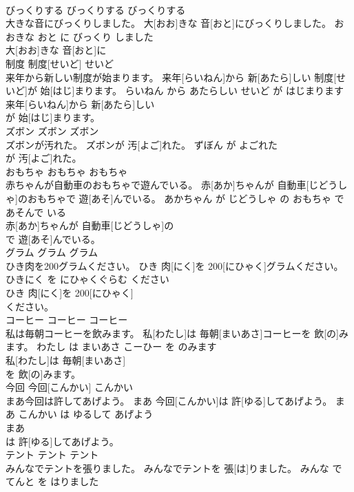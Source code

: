 \documentclass[8pt]{extreport}
\begin{document}
\begin{CJK}{UTF8}{min}
\\	びっくりする	びっくりする	びっくりする	
\\	大きな音にびっくりしました。	大[おお]きな 音[おと]にびっくりしました。	おおきな おと に びっくり しました	
\\	大[おお]きな 音[おと]に
\\	制度	制度[せいど]	せいど	
\\	来年から新しい制度が始まります。	来年[らいねん]から 新[あたら]しい 制度[せいど]が 始[はじ]まります。	らいねん から あたらしい せいど が はじまります	
\\	来年[らいねん]から 新[あたら]しい
\\	が 始[はじ]まります。			
\\	ズボン	ズボン	ズボン	
\\	ズボンが汚れた。	ズボンが 汚[よご]れた。	ずぼん が よごれた	
\\	が 汚[よご]れた。			
\\	おもちゃ	おもちゃ	おもちゃ	
\\	赤ちゃんが自動車のおもちゃで遊んでいる。	赤[あか]ちゃんが 自動車[じどうしゃ]のおもちゃで 遊[あそ]んでいる。	あかちゃん が じどうしゃ の おもちゃ で あそんで いる	
\\	赤[あか]ちゃんが 自動車[じどうしゃ]の
\\	で 遊[あそ]んでいる。			
\\	グラム	グラム	グラム	
\\	ひき肉を200グラムください。	ひき 肉[にく]を 200[にひゃく]グラムください。	ひきにく を にひゃくぐらむ ください	
\\	ひき 肉[にく]を 200[にひゃく]
\\	ください。			
\\	コーヒー	コーヒー	コーヒー	
\\	私は毎朝コーヒーを飲みます。	私[わたし]は 毎朝[まいあさ]コーヒーを 飲[の]みます。	わたし は まいあさ こーひー を のみます	
\\	私[わたし]は 毎朝[まいあさ]
\\	を 飲[の]みます。			
\\	今回	今回[こんかい]	こんかい	
\\	まあ今回は許してあげよう。	まあ 今回[こんかい]は 許[ゆる]してあげよう。	まあ こんかい は ゆるして あげよう	
\\	まあ
\\	は 許[ゆる]してあげよう。			
\\	テント	テント	テント	
\\	みんなでテントを張りました。	みんなでテントを 張[は]りました。	みんな で てんと を はりました	

\end{CJK}
\end{document}
